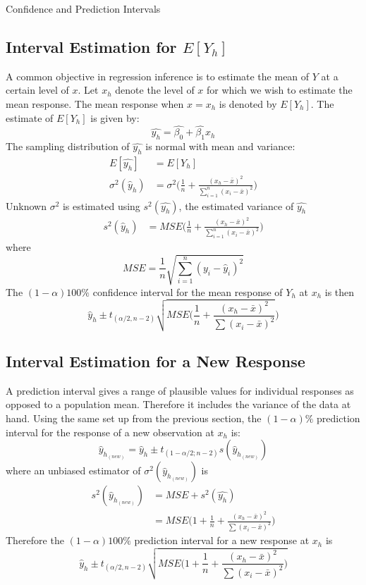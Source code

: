 \documentclass[12pt]{pom_thesis}
\begin{document}
\begin{chapter}{Confidence and Prediction Intervals}
\subsection{Interval Estimation for $E[Y_h]$}
A common objective in regression inference is to estimate the mean of $Y$ at a certain level of $x$. Let $x_h$ denote the level of $x$ for which we wish to estimate the mean response. The mean response when $x=x_h$ is denoted by $E[Y_h]$. The estimate of $E[Y_h]$ is given by:
\begin{equation}
    \hat{y_h}= \hat{\beta_0}+\hat{\beta_1}x_h
\end{equation}
The sampling distribution of $\hat{y_h}$ is normal with mean and variance:
\begin{align}
    E[\hat{y_h}] &= E[Y_h]\\
    \sigma^2(\hat{y}_h) &= \sigma^2\bigg(\frac{1}{n}+\frac{(x_h-\bar{x})^2}{\sum_{i=1}^n (x_i-\bar{x})^2}\bigg)
\end{align}
Unknown $\sigma^2$ is estimated using $s^2(\hat{y_h})$, the estimated variance of $\hat{y_h}$
\begin{align}
   s^2(\hat{y}_h) &= MSE \bigg(\frac{1}{n}+\frac{(x_h-\bar{x})^2}{\sum_{i=1}^n (x_i-\bar{x})^2}\bigg)   
\end{align}
where \begin{equation}
    MSE = \frac{1}{n}\sqrt{\sum_{i=1}^n (y_i -\hat{y}_i)^2}
\end{equation}
The $(1-\alpha)100\%$ confidence interval for the mean response of $Y_h$ at $x_h$ is then 
\begin{equation}
  \hat{y}_h \pm t_{(\alpha/2,n-2)}\sqrt{MSE\bigg(\frac{1}{n}+\frac{(x_h-\bar{x})^2}{\sum (x_i-\bar{x})^2}}\bigg)
\end{equation}


\subsection{Interval Estimation for a New Response}
A prediction interval gives a range of plausible values for individual responses as opposed to a population mean. Therefore it includes the variance of the data at hand. Using the same set up from the previous section, the $(1-\alpha)\%$ prediction interval for the response of a new observation at $x_h$ is:
\begin{equation}
    \hat{y}_h_{(new)}=\hat{y}_h \pm t_{(1-\alpha/2;n-2)}s(\hat{y}_h_{(new)})
\end{equation}
where an unbiased estimator of $\sigma^2(\hat{y}_h_{(new)})$ is 
\begin{align}
     s^2(\hat{y}_h_{(new)})&=MSE+s^2(\hat{y_h})\\
     &= MSE\bigg(1+\frac{1}{n}+\frac{(x_h-\bar{x})^2}{\sum (x_i-\bar{x})^2}\bigg)
\end{align}
Therefore the $(1-\alpha)100\%$ prediction interval for a new response at $x_h$ is 
\begin{equation}
  \hat{y}_h \pm t_{(\alpha/2,n-2)}\sqrt{MSE\bigg(1+\frac{1}{n}+\frac{(x_h-\bar{x})^2}{\sum (x_i-\bar{x})^2}\bigg)}   
\end{equation}


\end{chapter}
\end{document}
